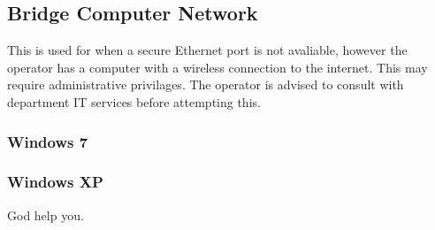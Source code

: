 \documentclass[11pt]{article}
\begin{document}
\subsection{Bridge Computer Network}
\label{subsec:bridge_computer_network}
This is used for when a secure Ethernet port is not avaliable, however the operator has a computer with a wireless connection to the internet. This may require administrative privilages. The operator is advised to consult with department IT services before attempting this.
\subsubsection{Windows 7}
\subsubsection{Windows XP}
God help you.
\end{document}
